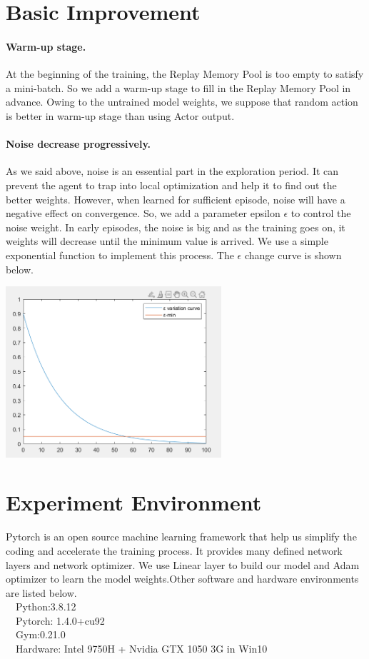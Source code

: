 \documentclass[a4paper,12pt,oneside,article]{memoir}
\newcommand{\mybold}[1]{\paragraph{#1.}} %
\begin{document}
\section{Basic Improvement}
\mybold{Warm-up stage}At the beginning of the training, the Replay Memory Pool is too empty to satisfy a mini-batch. So we add a warm-up stage to fill in the Replay Memory Pool in advance. Owing to the untrained model weights, we suppose that random action is better in warm-up stage than using Actor output.
\mybold{Noise decrease progressively}As we said above, noise is an essential part in the exploration period. It can prevent the agent to trap into local optimization and help it to find out the better weights. However, when learned for sufficient episode, noise will have a negative effect on convergence. So, we add a parameter epsilon $\epsilon$ to control the noise weight. In early episodes, the noise is big and as the training goes on, it weights will decrease until the minimum value is arrived. We use a simple exponential function to implement this process. The $\epsilon$ change curve is shown below.

\begin{center}
\includegraphics[width=8cm]{epsilon.png}
\label{fig:smiley}
\end{center}

\section{Experiment Environment}
Pytorch is an open source machine learning framework that help us simplify the coding and accelerate the training process. It provides many defined network layers and network optimizer. We use Linear layer to build our model and Adam optimizer to learn the model weights.Other software and hardware environments are listed below.
\\\ \ Python:3.8.12
\\\ \ Pytorch: 1.4.0+cu92
\\\ \ Gym:0.21.0
\\\ \ Hardware: Intel 9750H + Nvidia GTX 1050 3G in Win10
\end{document}
